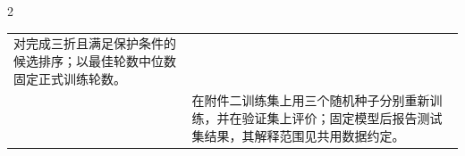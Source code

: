 \begin{PaperTable}{2}
\begin{table}[!htbp]
\begin{tabular}{@{}ll@{}}
\begin{minipage}[t]{\dimexpr 0.920000\linewidth-1.840000\tabcolsep\relax}
对完成三折且满足保护条件的候选排序；以最佳轮数中位数固定正式训练轮数。\strut
\end{minipage}\tabularnewline
\begin{minipage}[t]{\dimexpr 0.080000\linewidth-0.160000\tabcolsep\relax}\raggedleft
7\strut
\end{minipage} & \begin{minipage}[t]{\dimexpr 0.920000\linewidth-1.840000\tabcolsep\relax}\raggedright
在附件二训练集上用三个随机种子分别重新训练，并在验证集上评价；固定模型后报告测试集结果，其解释范围见共用数据约定。\strut
\end{minipage}\tabularnewline
\bottomrule
\end{tabular}
\end{table}

\end{PaperTable}

